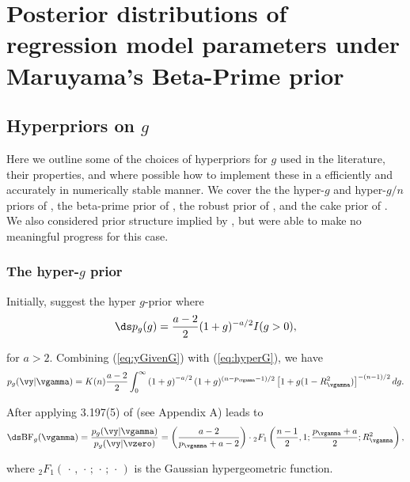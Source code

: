 \chapter{Posterior distributions of regression model parameters under Maruyama's Beta-Prime prior}

\section{Hyperpriors on $g$}

Here we outline some of the choices of hyperpriors for $g$ used in the literature, their
properties, and where possible how to implement these in a efficiently and 
accurately in
numerically stable manner. We cover the 
the hyper-$g$ and hyper-$g/n$ priors of \cite{Liang2008}, the beta-prime prior
of \cite{Maruyama2011}, the robust prior of \cite{Bayarri2012}, and the cake
prior of \cite{OrmerodEtal2017}.
We also considered prior structure implied by \cite{Zellner1980}, but were able to make no
meaningful progress for this case.


\subsection{The hyper-$g$ prior}

Initially, \cite{Liang2008} suggest the hyper $g$-prior where
\begin{equation}\label{eq:hyperG}
\ds p_{g}(g) = \frac{a - 2}{2}(1 + g)^{-a/2}I(g>0),
\end{equation}

\noindent for $a>2$. Combining (\ref{eq:yGivenG}) with (\ref{eq:hyperG}), we have
\begin{equation}\label{eq:hyperGmarginalIntegral}
p_{g}(\vy|\vgamma) = K(n) \frac{a - 2}{2}  \int_0^\infty 
\left( 1 + g \right)^{-a/2}
(1 + g)^{(n-p_\vgamma-1)/2} \left[ 1 + g (1 - R_\vgamma^2) \right]^{-(n-1)/2}  dg.
\end{equation}

\noindent After applying 
3.197(5) of \cite{Gradshteyn1988} (see Appendix A) leads to
\begin{equation}\label{eq:hyperGmarginal}
\ds \mbox{BF}_{g}(\vgamma) = \frac{p_{g}(\vy|\vgamma)}{p_{g}(\vy|\vzero)} =  \left( \frac{a - 2}{p_\vgamma + a - 2} \right) \cdot {}_2F_1\left( \frac{n-1}{2}, 1; \frac{p_\vgamma + a}{2}; R_\vgamma^2 \right),
\end{equation}

\noindent where ${}_2F_1(\,\cdot\,,\,\cdot\,;\,\cdot\,;\,\cdot\,)$ is the Gaussian hypergeometric function.

